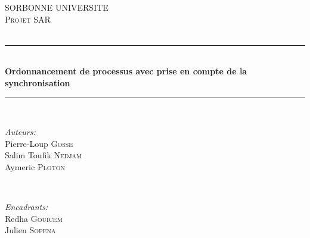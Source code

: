 \begin{titlepage}

\newcommand{\HRule}{\rule{\linewidth}{0.5mm}} %

\center %


\textsc{\LARGE SORBONNE UNIVERSITE}\\[1.5cm] %
\textsc{\Large Projet SAR}\\[0.5cm] %
\textsc{\large }\\[0.5cm] %


\HRule \\[0.4cm]
{ \huge \bfseries Ordonnancement de processus avec prise en compte de la synchronisation}\\[0.4cm] %
\HRule \\[1.5cm]


\begin{minipage}{0.4\textwidth}
\begin{flushleft} \large
\emph{Auteurs:}\\
Pierre-Loup \textsc{Gosse}\\
Salim Toufik \textsc{Nedjam}\\
Aymeric \textsc{Ploton}
\end{flushleft}
\end{minipage}
~
\begin{minipage}{0.4\textwidth}
\begin{flushright} \large
\emph{Encadrants:} \\
Redha \textsc{Gouicem}\\
Julien \textsc{Sopena}
\end{flushright}
\end{minipage}\\[2cm]


\end{titlepage}
